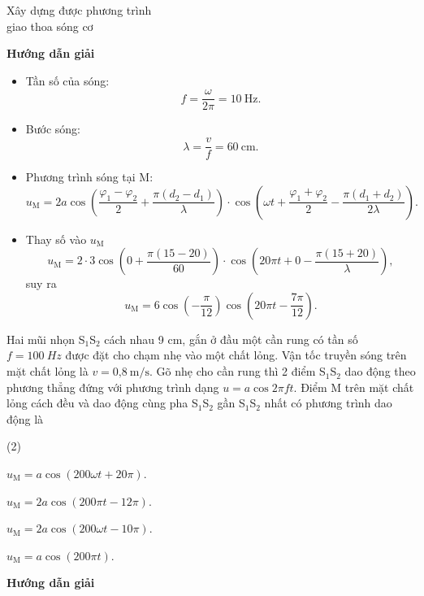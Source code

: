 \begin{dang}{Xây dựng được phương trình\\ giao thoa sóng cơ}
	{
		\begin{center}
			\textbf{Hướng dẫn giải}
		\end{center}
		
		\begin{itemize}
			\item Tần số của sóng:
			\begin{equation*}
				f=\dfrac{\omega}{2\pi} = 10\ \text{Hz}.
			\end{equation*}
			\item Bước sóng:
			\begin{equation*}
				\lambda = \dfrac{v}{f} = 60\ \text{cm}.
			\end{equation*}
			\item Phương trình sóng tại M:
			\begin{equation*}
				u_{\text{M}}=2a \cos \left(\dfrac{\varphi_1 - \varphi_2}{2} + \dfrac{\pi (d_2-d_1)}{\lambda}\right) \cdot  \cos \left(\omega t +\dfrac{\varphi_1 + \varphi_2}{2} - \dfrac{\pi (d_1+d_2)}{2\lambda}\right).
			\end{equation*}
			\item Thay số vào $u_{\text{M}}$ 
			\begin{equation*}
				u_{\text{M}}= 2 \cdot 3 \cos \left(0 + \dfrac{\pi (15-20)}{60}\right) \cdot  \cos \left(20\pi t + 0 - \dfrac{\pi (15+20)}{\lambda}\right),
			\end{equation*}
			suy ra 
			\begin{equation*}
				u_{\text{M}}= 6 \cos \left(-\dfrac{\pi}{12}\right) \cos \left(20\pi t - \dfrac{7\pi}{12}\right).
			\end{equation*}
		\end{itemize} 
	}
	
	{
		Hai mũi nhọn S$_1$S$_2$ cách nhau 9 cm, gắn ở đầu một cần rung có tần số $f=\SI{100}{Hz}$ được đặt cho chạm nhẹ vào một chất lỏng. Vận tốc truyền sóng trên mặt chất lỏng là $v=\text{0,8}\ \text{m/s}$. Gõ nhẹ cho cần rung thì 2 điểm S$_1$S$_2$ dao động theo phương thẳng đứng với phương trình dạng $u=a\cos 2\pi ft$. Điểm M trên mặt chất lỏng cách đều và dao động cùng pha S$_1$S$_2$ gần S$_1$S$_2$ nhất có phương trình dao động là
		\begin{mcq}(2)
			\item $u_\text{M} = a\cos (200\omega t + 20\pi)$.
			\item $u_\text{M} = 2a\cos (200\pi t - 12\pi)$.
			\item $u_\text{M} = 2a\cos (200\omega t - 10\pi)$.
			\item $u_\text{M} = a\cos (200\pi t )$.
		\end{mcq}
	}{
		\begin{center}
			\textbf{Hướng dẫn giải}
		\end{center}
		
}
\end{dang}
